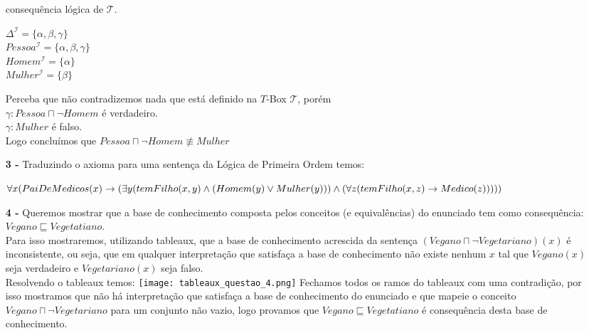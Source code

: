 \documentclass[12pt]{article}
\begin{document}
\begin{itemize}
			consequência lógica de $\mathcal{T}$.
			\begin{center}
				$\Delta^\mathcal{I} = \lbrace \alpha, \beta, \gamma \rbrace$\\
				$Pessoa^\mathcal{I} = \lbrace \alpha, \beta, \gamma \rbrace$\\
				$Homem^\mathcal{I} = \lbrace \alpha \rbrace$\\
				$Mulher^\mathcal{I} = \lbrace \beta \rbrace$
			\end{center}
			Perceba que não contradizemos nada que está definido na $T$-Box $\mathcal{T}$,
			porém\\
			$\gamma: Pessoa \sqcap \neg Homem$ é verdadeiro.\\
			$\gamma: Mulher$ é falso.\\
			Logo concluímos que $Pessoa \sqcap \neg Homem \not\equiv Mulher$
			
		\item[\textbf{3 -}]
			\hfill\newline
			Traduzindo o axioma para uma sentença da Lógica de Primeira Ordem temos:\\
			\begin{footnotesize}
			$\forall x( PaiDeMedicos(x) \rightarrow \\ (\exists y(temFilho(x, y) \wedge (Homem(y) \vee Mulher(y))) \wedge (\forall z (temFilho(x, z) \rightarrow Medico(z)))))$
			\end{footnotesize}			
		\item[\textbf{4 -}]
			\hfill\newline
			Queremos mostrar que a base de conhecimento composta pelos conceitos (e equivalências) do
			enunciado tem como consequência:\\ $Vegano \sqsubseteq Vegetatiano$. \\
			Para isso mostraremos,
			utilizando tableaux, que a base de conhecimento acrescida da sentença $(Vegano \sqcap \neg 
			Vegetariano)(x)$ é inconsistente, ou
			seja, que em qualquer interpretação que satisfaça a base de conhecimento não existe nenhum $x$
			tal que $Vegano(x)$ seja verdadeiro e $Vegetariano(x)$ seja falso.\\
			\newpage
			Resolvendo o tableaux temos:
			\hfill\newline	\hfill\newline			
			\texttt{[image: tableaux\_questao\_4.png]}
			\newpage	
			Fechamos todos os ramos do tableaux com uma contradição, por isso
			mostramos que não há interpretação que satisfaça a base de
			conhecimento do enunciado e que mapeie o conceito
			$Vegano \sqcap \neg Vegetariano$ para um conjunto não vazio,
			logo provamos que $Vegano \sqsubseteq Vegetatiano$ é
			consequência desta base de conhecimento.
	\end{itemize}
\end{document}
